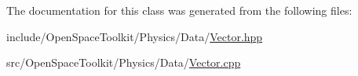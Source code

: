 The documentation for this class was generated from the following files\+:\begin{DoxyCompactItemize}
\item 
include/\+Open\+Space\+Toolkit/\+Physics/\+Data/\hyperlink{_vector_8hpp}{Vector.\+hpp}\item 
src/\+Open\+Space\+Toolkit/\+Physics/\+Data/\hyperlink{_vector_8cpp}{Vector.\+cpp}\end{DoxyCompactItemize}
